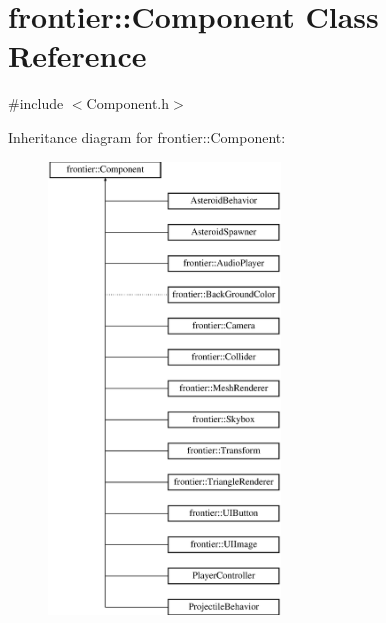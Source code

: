 \hypertarget{classfrontier_1_1_component}{}\section{frontier\+:\+:Component Class Reference}
\label{classfrontier_1_1_component}


{\ttfamily \#include $<$Component.\+h$>$}

Inheritance diagram for frontier\+:\+:Component\+:\begin{figure}[H]
\begin{center}
\leavevmode
\includegraphics[height=12.000000cm]{classfrontier_1_1_component}
\end{center}
\end{figure}
